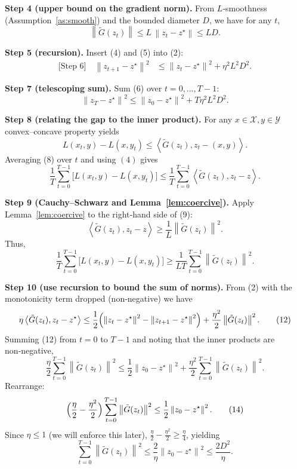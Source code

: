 \documentclass{article}
\newcommand{\norm}[1]{\left\|#1\right\|}
\newcommand{\inner}[2]{\left\langle #1,#2\right\rangle}
\begin{document}
\noindent\textbf{Step 4 (upper bound on the gradient norm).}  
From $L$‑smoothness (Assumption~\ref{as:smooth}) and the bounded diameter $D$, we have for any $t$,
\[
\norm{\tilde{G}(z_{t})}\le L\,\norm{z_{t}-z^{\star}}\le L D.
\tag{5}
\]

\noindent\textbf{Step 5 (recursion).}  
Insert (4) and (5) into (2):
\[
\begin{aligned}
\text{[Step 6]} \quad
\norm{z_{t+1}-z^{\star}}^{2}
&\le \norm{z_{t}-z^{\star}}^{2}+ \eta^{2}L^{2}D^{2}.
\end{aligned}
\tag{6}
\]

\noindent\textbf{Step 7 (telescoping sum).}  
Sum (6) over $t=0,\dots,T-1$:
\[
\norm{z_{T}-z^{\star}}^{2}
\le \norm{z_{0}-z^{\star}}^{2}+T\eta^{2}L^{2}D^{2}.
\tag{7}
\]

\noindent\textbf{Step 8 (relating the gap to the inner product).}  
For any $x\in\mathcal{X},y\in\mathcal{Y}$ convex–concave property yields
\[
L(x_{t},y)-L(x,y_{t})\le\inner{\tilde{G}(z_{t})}{z_{t}-(x,y)}.
\tag{8}
\]
Averaging (8) over $t$ and using $(4)$ gives
\[
\frac{1}{T}\sum_{t=0}^{T-1}\bigl[L(x_{t},y)-L(x,y_{t})\bigr]
\le \frac{1}{T}\sum_{t=0}^{T-1}\inner{\tilde{G}(z_{t})}{z_{t}-z}.
\tag{9}
\]

\noindent\textbf{Step 9 (Cauchy–Schwarz and Lemma~\ref{lem:coercive}).}  
Apply Lemma~\ref{lem:coercive} to the right‑hand side of (9):
\[
\inner{\tilde{G}(z_{t})}{z_{t}-z}
\ge \frac{1}{L}\norm{\tilde{G}(z_{t})}^{2}.
\tag{10}
\]
Thus,
\[
\frac{1}{T}\sum_{t=0}^{T-1}\bigl[L(x_{t},y)-L(x,y_{t})\bigr]
\ge \frac{1}{LT}\sum_{t=0}^{T-1}\norm{\tilde{G}(z_{t})}^{2}.
\tag{11}
\]

\noindent\textbf{Step 10 (use recursion to bound the sum of norms).}  
From (2) with the monotonicity term dropped (non‑negative) we have
\[
\eta\inner{\tilde{G}(z_{t})}{z_{t}-z^{\star}}
\le \frac{1}{2}\Bigl(\norm{z_{t}-z^{\star}}^{2}-\norm{z_{t+1}-z^{\star}}^{2}\Bigr)+\frac{\eta^{2}}{2}\norm{\tilde{G}(z_{t})}^{2}.
\tag{12}
\]
Summing (12) from $t=0$ to $T-1$ and noting that the inner products are non‑negative,
\[
\frac{\eta}{2}\sum_{t=0}^{T-1}\norm{\tilde{G}(z_{t})}^{2}
\le \frac{1}{2}\norm{z_{0}-z^{\star}}^{2}+ \frac{\eta^{2}}{2}\sum_{t=0}^{T-1}\norm{\tilde{G}(z_{t})}^{2}.
\tag{13}
\]
Rearrange:
\[
\Bigl(\frac{\eta}{2}-\frac{\eta^{2}}{2}\Bigr)\sum_{t=0}^{T-1}\norm{\tilde{G}(z_{t})}^{2}
\le \frac{1}{2}\norm{z_{0}-z^{\star}}^{2}.
\tag{14}
\]
Since $\eta\le1$ (we will enforce this later), $\frac{\eta}{2}-\frac{\eta^{2}}{2}\ge \frac{\eta}{4}$, yielding
\[
\sum_{t=0}^{T-1}\norm{\tilde{G}(z_{t})}^{2}
\le \frac{2}{\eta}\norm{z_{0}-z^{\star}}^{2}
\le \frac{2D^{2}}{\eta}.
\tag{15}
\]
\end{document}
